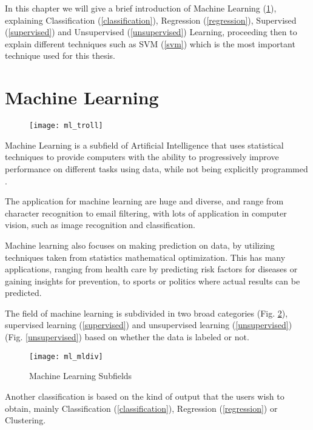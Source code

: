 In this chapter we will give a brief introduction of Machine Learning (\ref{ml}), explaining Classification (\ref{classification}), Regression (\ref{regression}), Supervised (\ref{supervised}) and Unsupervised (\ref{unsupervised}) Learning, 
proceeding then to explain different techniques such as SVM (\ref{svm}) which is the most important technique used for this thesis.

\section{Machine Learning} \label{ml}
\begin{figure}[H]
	\centering
	\texttt{[image: ml\_troll]}
	\label{fig:ml_troll}
\end{figure}
Machine Learning is a subfield of Artificial Intelligence that uses statistical techniques to provide computers with the ability to progressively improve performance on different tasks using data, while not being explicitly programmed \cite{wiki:ml}.

The application for machine learning are huge and diverse, and range from character recognition to email filtering, with lots of application in computer vision, such as image recognition and classification.

Machine learning also focuses on making prediction on data, by utilizing techniques taken from statistics  mathematical optimization. This has many applications, ranging from health care by predicting risk factors for diseases or gaining insights for prevention, to sports or politics where actual results can be predicted.

The field of machine learning is subdivided in two broad categories (Fig. \ref{fig:ml_mldiv}), supervised learning (\ref{supervised}) and unsupervised learning (\ref{unsupervised}) (Fig. \ref{unsupervised}) based on whether the data is labeled or not.

\begin{figure}[H]
	\centering
	\texttt{[image: ml\_mldiv]}
	\caption{Machine Learning Subfields \cite{ml_mldiv}}
	\label{fig:ml_mldiv}
\end{figure}

Another classification is based on the kind of output that the users wish to obtain, mainly Classification (\ref{classification}), Regression (\ref{regression}) or Clustering.

